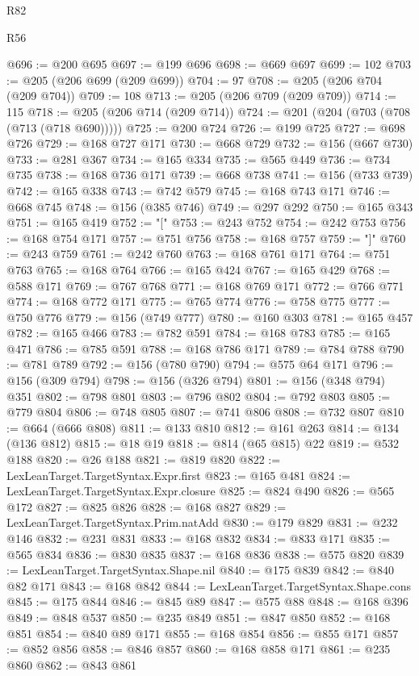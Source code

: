 \begin{lexlean}{R82}
\begin{lexlean}{R56}
\begin{coremodule}
{{{{{{{{{{{{{{{{{{{{{{{{{{{{{{{{{{{{{{{{{{{{{{{{{{{{{{{{{{{{{{{{{{{{{{{{{{{{{{{{{{{{{{{{{{{{{{{{{{{{{{{{{{{{{{{{{{{{{{{{{{{{{{{{{{{{{{{{{{{{{{{{{{{{{{{{{{{{{{{{{{{{{{{{{{{{{{{{{{{{{{{{{{{{{{{{{{{{{{{{{{{{{{{{{{{@696 := @200 @695
@697 := @199 @696
@698 := @669 @697
@699 := 102
@703 := @205 (@206 @699 (@209 @699))
@704 := 97
@708 := @205 (@206 @704 (@209 @704))
@709 := 108
@713 := @205 (@206 @709 (@209 @709))
@714 := 115
@718 := @205 (@206 @714 (@209 @714))
@724 := @201 (@204 (@703 (@708 (@713 (@718 @690)))))
@725 := @200 @724
@726 := @199 @725
@727 := @698 @726
@729 := @168 @727 @171
@730 := @668 @729
@732 := @156 (@667 @730)
@733 := @281 @367
@734 := @165 @334
@735 := @565 @449
@736 := @734 @735
@738 := @168 @736 @171
@739 := @668 @738
@741 := @156 (@733 @739)
@742 := @165 @338
@743 := @742 @579
@745 := @168 @743 @171
@746 := @668 @745
@748 := @156 (@385 @746)
@749 := @297 @292
@750 := @165 @343
@751 := @165 @419
@752 := "["
@753 := @243 @752
@754 := @242 @753
@756 := @168 @754 @171
@757 := @751 @756
@758 := @168 @757
@759 := "]"
@760 := @243 @759
@761 := @242 @760
@763 := @168 @761 @171
@764 := @751 @763
@765 := @168 @764
@766 := @165 @424
@767 := @165 @429
@768 := @588 @171
@769 := @767 @768
@771 := @168 @769 @171
@772 := @766 @771
@774 := @168 @772 @171
@775 := @765 @774
@776 := @758 @775
@777 := @750 @776
@779 := @156 (@749 @777)
@780 := @160 @303
@781 := @165 @457
@782 := @165 @466
@783 := @782 @591
@784 := @168 @783
@785 := @165 @471
@786 := @785 @591
@788 := @168 @786 @171
@789 := @784 @788
@790 := @781 @789
@792 := @156 (@780 @790)
@794 := @575 @64 @171
@796 := @156 (@309 @794)
@798 := @156 (@326 @794)
@801 := @156 (@348 @794) @351
@802 := @798 @801
@803 := @796 @802
@804 := @792 @803
@805 := @779 @804
@806 := @748 @805
@807 := @741 @806
@808 := @732 @807
@810 := @664 (@666 @808)
@811 := @133 @810
@812 := @161 @263
@814 := @134 (@136 @812)
@815 := @18 @19
@818 := @814 (@65 @815) @22
@819 := @532 @188
@820 := @26 @188
@821 := @819 @820
@822 := LexLeanTarget.TargetSyntax.Expr.first
@823 := @165 @481
@824 := LexLeanTarget.TargetSyntax.Expr.closure
@825 := @824 @490
@826 := @565 @172
@827 := @825 @826
@828 := @168 @827
@829 := LexLeanTarget.TargetSyntax.Prim.natAdd
@830 := @179 @829
@831 := @232 @146
@832 := @231 @831
@833 := @168 @832
@834 := @833 @171
@835 := @565 @834
@836 := @830 @835
@837 := @168 @836
@838 := @575 @820
@839 := LexLeanTarget.TargetSyntax.Shape.nil
@840 := @175 @839
@842 := @840 @82 @171
@843 := @168 @842
@844 := LexLeanTarget.TargetSyntax.Shape.cons
@845 := @175 @844
@846 := @845 @89
@847 := @575 @88
@848 := @168 @396
@849 := @848 @537
@850 := @235 @849
@851 := @847 @850
@852 := @168 @851
@854 := @840 @89 @171
@855 := @168 @854
@856 := @855 @171
@857 := @852 @856
@858 := @846 @857
@860 := @168 @858 @171
@861 := @235 @860
@862 := @843 @861
}}}}}}}}}}}}}}}}}}}}}}}}}}}}}}}}}}}}}}}}}}}}}}}}}}}}}}}}}}}}}}}}}}}}}}}}}}}}}}}}}}}}}}}}}}}}}}}}}}}}}}}}}}}}}}}}}}}}}}}}}}}}}}}}}}}}}}}}}}}}}}}}}}}}}}}}}}}}}}}}}}}}}}}}}}}}}}}}}}}}}}}}}}}}}}}}}}}}}}}}}}}}}}}}}}}
\end{coremodule}
\end{lexlean}
\end{lexlean}
